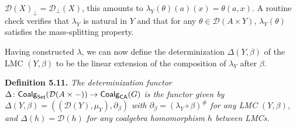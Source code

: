\documentclass[11pt,a4paper]{amsart}
\begin{document}
\hypertarget{html:S5.SS0.SSS0.Px2.p2.m6}{}\({{\mathcal{D}}(X)_{\bot}={\mathcal{D}}_{\bot}(X)}\), this amounts to %
\hypertarget{html:S5.SS0.SSS0.Px2.p2.m7}{}\({\lambda_{Y}(\theta)(a)(x)=\theta(a,x)}\). A routine check verifies that %
\hypertarget{html:S5.SS0.SSS0.Px2.p2.m8}{}\({\lambda_{Y}}\) is natural in %
\hypertarget{html:S5.SS0.SSS0.Px2.p2.m9}{}\({Y}\) and that for any %
\hypertarget{html:S5.SS0.SSS0.Px2.p2.m10}{}\({\theta\in{\mathcal{D}}(A\times Y)}\), %
\hypertarget{html:S5.SS0.SSS0.Px2.p2.m11}{}\({\lambda_{Y}(\theta)}\) satisfies the mass-splitting property.
\par\medskip
\hypertarget{html:S5.SS0.SSS0.Px2.p3}{} Having constructed %
\hypertarget{html:S5.SS0.SSS0.Px2.p3.m1}{}\({\lambda}\), we can now define the determinization %
\hypertarget{html:S5.SS0.SSS0.Px2.p3.m2}{}\({\Delta(Y,\beta)}\) of the LMC %
\hypertarget{html:S5.SS0.SSS0.Px2.p3.m3}{}\({(Y,\beta)}\) to be the linear extension of the composition of %
\hypertarget{html:S5.SS0.SSS0.Px2.p3.m4}{}\({\lambda_{Y}}\) after %
\hypertarget{html:S5.SS0.SSS0.Px2.p3.m5}{}\({\beta}\).
\par\medskip
\hypertarget{html:S5.Thmtheorem11}{} \par\noindent\textbf{\textbf{Definition 5.11}\textbf{.}}\quad  %
\hypertarget{html:S5.Thmtheorem11.p1}{} \emph{The \emph{determinization functor} %
\hypertarget{html:S5.Thmtheorem11.p1.m1}{}\({\Delta\colon\mbox{\sf Coalg}_{\mathsf{Set}}({\mathcal{D}}(A\times-))\to\mbox{\sf Coalg}_{\mathsf{CA}}(G)}\) is the functor given by %
\hypertarget{html:S5.Thmtheorem11.p1.m2}{}\({\Delta(Y,\beta)=(({\mathcal{D}}(Y),\mu_{Y}),\partial_{\beta})}\) with %
\hypertarget{html:S5.Thmtheorem11.p1.m3}{}\({\partial_{\beta}=(\lambda_{Y}\circ\beta)^{\#}}\) for any LMC %
\hypertarget{html:S5.Thmtheorem11.p1.m4}{}\({(Y,\beta)}\), and %
\hypertarget{html:S5.Thmtheorem11.p1.m5}{}\({\Delta(h)={\mathcal{D}}(h)}\) for any coalgebra homomorphism %
\hypertarget{html:S5.Thmtheorem11.p1.m6}{}\({h}\) between LMCs.}
\end{document}
